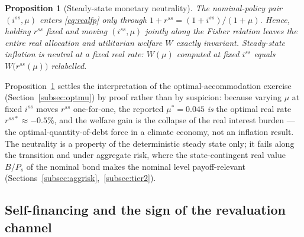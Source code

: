 \documentclass[12pt]{article}
\newtheorem{proposition}{Proposition}
\begin{document}
\begin{proposition}[Steady-state monetary neutrality]\label{prop:muneutral}
The nominal-policy pair $(i^{ss},\mu)$ enters \eqref{eq:realfp} only through
$1+r^{ss}=(1+i^{ss})/(1+\mu)$. Hence, holding $r^{ss}$ fixed and moving
$(i^{ss},\mu)$ jointly along the Fisher relation leaves the entire real
allocation and utilitarian welfare $W$ exactly invariant. Steady-state
inflation is neutral at a fixed real rate: $W(\mu)$ computed at fixed
$i^{ss}$ equals $W\big(r^{ss}(\mu)\big)$ relabelled.
\end{proposition}

Proposition~\ref{prop:muneutral} settles the interpretation of the
optimal-accommodation exercise (Section~\ref{subsec:optmu}) by proof rather
than by suspicion: because varying $\mu$ at fixed $i^{ss}$ moves $r^{ss}$
one-for-one, the reported $\mu^{*}=0.045$ \emph{is} the optimal real rate
$r^{ss*}\approx-0.5\%$, and the welfare gain is the collapse of the real
interest burden --- the \citet{aiyagarimcgrattan1998} optimal-quantity-of-debt
force in a climate economy, not an inflation result. The neutrality is a
property of the deterministic steady state only; it fails along the
transition and under aggregate risk, where the state-contingent real value
$B/P_s$ of the nominal bond makes the nominal level payoff-relevant
(Sections~\ref{subsec:aggrisk},~\ref{subsec:tier2}).

\subsection{Self-financing and the sign of the revaluation channel}
\end{document}
